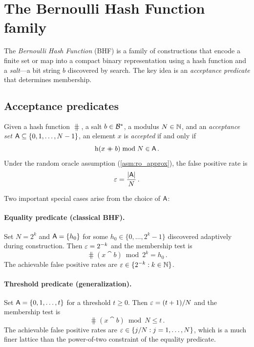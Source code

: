 \section{The Bernoulli Hash Function family}
\label{sec:shf}

The \emph{Bernoulli Hash Function} (BHF) is a family of constructions that
encode a finite set or map into a compact binary representation using a hash
function and a \emph{salt}---a bit string $b$ discovered by search.
The key idea is an \emph{acceptance predicate} that determines membership.

\subsection{Acceptance predicates}

\begin{definition}
\label{def:acceptance}
Given a hash function $\hash$, a salt $b \in \mathcal{B}^{*}$, a modulus $N \in \mathbb{N}$,
and an \emph{acceptance set} $\Set{A} \subseteq \{0, 1, \ldots, N-1\}$, an
element $x$ is \emph{accepted} if and only if
\begin{equation}
    \hash(x \cat b) \bmod N \in \Set{A}\,.
\end{equation}
Under the random oracle assumption (\cref{asm:ro_approx}), the false positive
rate is
\begin{equation}
    \fprate = \frac{\Card{\Set{A}}}{N}\,.
\end{equation}
\end{definition}

Two important special cases arise from the choice of $\Set{A}$:

\paragraph{Equality predicate (classical BHF).}
Set $N = 2^k$ and $\Set{A} = \{h_0\}$ for some $h_0 \in \{0,\ldots,2^k-1\}$
discovered adaptively during construction.
Then $\varepsilon = 2^{-k}$ and the membership test is
\begin{equation}
    \hash(x \cat b) \bmod 2^k = h_0\,.
\end{equation}
The achievable false positive rates are $\varepsilon \in \{2^{-k} : k \in \mathbb{N}\}$.

\paragraph{Threshold predicate (generalization).}
Set $\Set{A} = \{0, 1, \ldots, t\}$ for a threshold $t \geq 0$.
Then $\varepsilon = (t+1)/N$ and the membership test is
\begin{equation}
\label{eq:threshold_test}
    \hash(x \cat b) \bmod N \leq t\,.
\end{equation}
The achievable false positive rates are
$\varepsilon \in \{j/N : j = 1, \ldots, N\}$, which is a much finer lattice
than the power-of-two constraint of the equality predicate.

